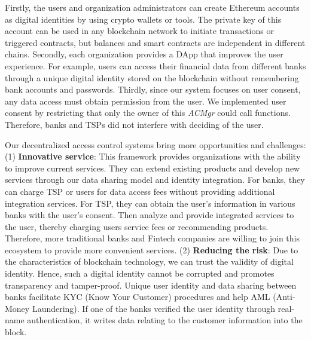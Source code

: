 Firstly, the users and organization administrators can create Ethereum accounts as digital identities by using crypto wallets or tools. The private key of this account can be used in any blockchain network to initiate transactions or triggered contracts, but balances and smart contracts are independent in different chains. Secondly, each organization provides a DApp that improves the user experience. For example, users can access their financial data from different banks through a unique digital identity stored on the blockchain without remembering bank accounts and passwords. Thirdly, since our system focuses on user consent, any data access must obtain permission from the user. We implemented user consent by restricting that only the owner of this \textit{ACMgr} could call functions. Therefore, banks and TSPs did not interfere with deciding of the user.
\par 

Our decentralized access control systems bring more opportunities and challenges: (1) \textbf{Innovative service}: This framework provides organizations with the ability to improve current services. They can extend existing products and develop new services through our data sharing model and identity integration. For banks, they can charge TSP or users for data access fees without providing additional integration services. For TSP, they can obtain the user's information in various banks with the user's consent. Then analyze and provide integrated services to the user, thereby charging users service fees or recommending products. Therefore, more traditional banks and Fintech companies are willing to join this ecosystem to provide more convenient services. (2) \textbf{Reducing the risk}: Due to the characteristics of blockchain technology, we can trust the validity of digital identity. Hence, such a digital identity cannot be corrupted and promotes transparency and tamper-proof. Unique user identity and data sharing between banks facilitate KYC (Know Your Customer) procedures and help AML (Anti-Money Laundering). If one of the banks verified the user identity through real-name authentication, it writes data relating to the customer information into the block.

